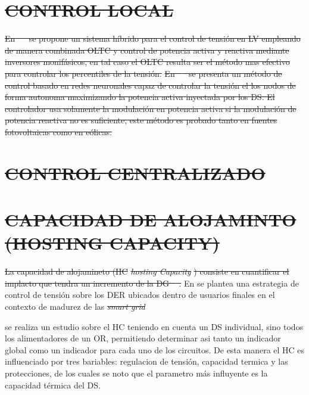 \documentclass[12pt, letterpaper]{report}
\providecommand{\DIFdeltex}[1]{{\protect\color{red}\sout{#1}}}                      %
\providecommand{\DIFdelFL}[1]{\DIFdel{#1}} %
\providecommand{\DIFdel}[1]{\texorpdfstring{\DIFdeltex{#1}}{}} %
\begin{document}
\section{\DIFdelFL{CONTROL LOCAL}}
\addtocounter{section}{-1}%
\DIFdelFL{En \mbox{%
\cite{Efkarpidis2016} }%
se propone un sistema híbrido para el control de tensión en LV empleando de manera combinada OLTC y control de potencia activa y reactiva mediante inversores monifásicos, en tal caso el OLTC resulta ser el método mas efectivo para controlar los percentiles de la tensión.} \DIFdelFL{En \mbox{%
\cite{Calderaro2014} }%
se presenta un método de control basado en redes neuronales  capaz de controlar la tensión el los nodos de forma autonoma maximizando la potencia activa inyectada por los DS. El controlador usa solamente la modulación en potencia activa si la modulación  de potencia reactiva no es suficiente, este método es probado tanto en fuentes fotovoltaicas  como en eólicas.}

    \section{\DIFdelFL{CONTROL CENTRALIZADO}}
\addtocounter{section}{-1}%
\section{\DIFdelFL{CAPACIDAD DE ALOJAMINTO (HOSTING CAPACITY)}}	
\addtocounter{section}{-1}%
\DIFdelFL{La capacidad de alojamineto (HC }\textit{\DIFdelFL{hosting Capacity}}%
\DIFdelFL{) consiste en cuantificar el implacto que tendra un incremento de la DG \mbox{%
\cite{Bollen2008}}%
. }
En \cite{Caldon2015a} %
se plantea una estrategia de control de tensión sobre los DER ubicados dentro  de usuarios finales en el contexto de madurez de las \textit{\DIFdelFL{smart grid}}%

\cite{Rylander2016a} %
se realiza un estudio sobre el HC teniendo en cuenta un DS individual, sino todos los alimentadores de un OR, permitiendo determinar  asi tanto un indicador global como un indicador para cada uno de los circuitos.  De esta manera el HC es influenciado por tres bariables: regulacion de tensión, capacidad termica  y las protecciones, de los cuales se noto que el parametro más influyente es la capacidad térmica del DS.


    
    
\end{document}
